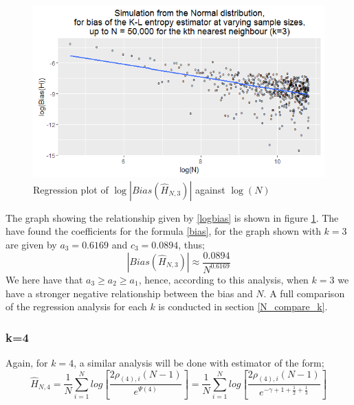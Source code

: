 \documentclass{article}
\begin{document}
\begin{figure}
  \begin{center}
    \includegraphics[width=\textwidth]{./Graphs/new_normal_k=3.png}
  \end{center}
\caption{Regression plot of $\log|Bias(\hat{H}_{N, 3})|$ against $\log(N)$}
  \label{normal_k=3_graph}
\end{figure}

The graph showing the relationship given by \ref{logbias} is shown in figure \ref{normal_k=3_graph}. The have found the coefficients for the formula \ref{bias}, for the graph shown with $k=3$ are given by $a_{3} = 0.6169$ and $c_{3} = 0.0894$, thus;
\begin{equation}
|Bias(\hat{H}_{N, 3})| \approx \frac{0.0894}{N^{0.6169}} \nonumber
\end{equation}
 We here have that $a_{3} \geq a_{2} \geq a_{1}$, hence, according to this analysis, when $k=3$ we have a stronger negative relationship between the bias and $N$. A full comparison of the regression analysis for each $k$ is conducted in section \ref{N_compare_k}.



\subsubsection{k=4} \label{N_k=4}
Again, for $k=4$, a similar analysis will be done with estimator of the form;
\begin{equation}
\hat{H}_{N, 4} = \frac{1}{N} \sum_{i=1}^{N} log \left[ \frac{2\rho_{(4),i} (N-1)}{e^{\Psi(4)}} \right] = \frac{1}{N} \sum_{i=1}^{N} log \left[ \frac{2\rho_{(4),i} (N-1)}{e^{-\gamma + 1 + \frac{1}{2} + \frac{1}{3}}} \right] \nonumber
\end{equation}
\end{document}
